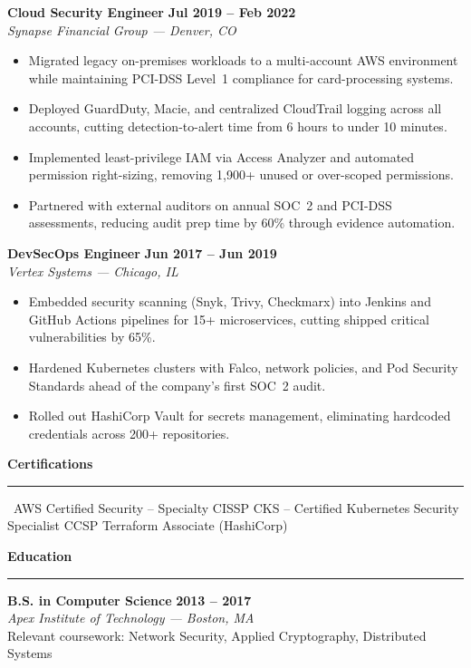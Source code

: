 \documentclass[10pt,letterpaper]{article}
\newcommand{\sechead}[1]{%
  \vspace{1pt}
  {\color{navy}\large\bfseries #1}\par
  \vspace{-7pt}
  {\color{accent}\rule{\linewidth}{1.1pt}}\par
  \vspace{1pt}
}
\newcommand{\role}[4]{%
  \textbf{#1} \hfill \textbf{\small #3}\\
  {\color{accent}\itshape #2} \hfill {\small\itshape #4}\\[2pt]
}
\begin{document}
\vspace{0pt}
\role{Cloud Security Engineer}{Synapse Financial Group --- Denver, CO}{Jul 2019 -- Feb 2022}{}
\begin{itemize}[leftmargin=14pt,itemsep=1pt,topsep=2pt,parsep=0pt]
  \small
  \item Migrated legacy on-premises workloads to a multi-account AWS environment while
    maintaining PCI-DSS Level~1 compliance for card-processing systems.
  \item Deployed GuardDuty, Macie, and centralized CloudTrail logging across all accounts,
    cutting detection-to-alert time from 6 hours to under 10 minutes.
  \item Implemented least-privilege IAM via Access Analyzer and automated permission
    right-sizing, removing 1,900+ unused or over-scoped permissions.
  \item Partnered with external auditors on annual SOC~2 and PCI-DSS assessments, reducing audit
    prep time by 60\% through evidence automation.
\end{itemize}

\vspace{0pt}
\role{DevSecOps Engineer}{Vertex Systems --- Chicago, IL}{Jun 2017 -- Jun 2019}{}
\begin{itemize}[leftmargin=14pt,itemsep=1pt,topsep=2pt,parsep=0pt]
  \small
  \item Embedded security scanning (Snyk, Trivy, Checkmarx) into Jenkins and GitHub Actions
    pipelines for 15+ microservices, cutting shipped critical vulnerabilities by 65\%.
  \item Hardened Kubernetes clusters with Falco, network policies, and Pod Security Standards
    ahead of the company's first SOC~2 audit.
  \item Rolled out HashiCorp Vault for secrets management, eliminating hardcoded credentials
    across 200+ repositories.
\end{itemize}

\sechead{Certifications}
\small
\faLock\ AWS Certified Security -- Specialty \quad\textbullet\quad
CISSP \quad\textbullet\quad
CKS -- Certified Kubernetes Security Specialist \quad\textbullet\quad
CCSP \quad\textbullet\quad
Terraform Associate (HashiCorp)

\sechead{Education}
\textbf{B.S. in Computer Science} \hfill \textbf{\small 2013 -- 2017}\\
{\color{accent}\itshape Apex Institute of Technology --- Boston, MA}\\[1pt]
{\small Relevant coursework: Network Security, Applied Cryptography, Distributed Systems}
\end{document}
